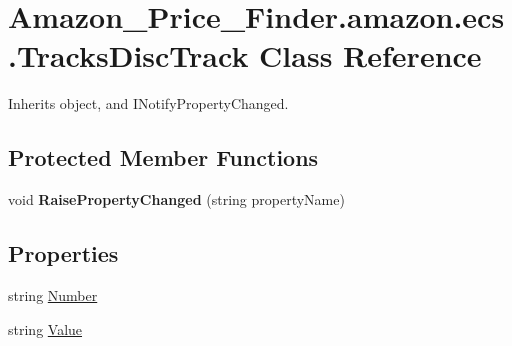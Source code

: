 \hypertarget{class_amazon___price___finder_1_1amazon_1_1ecs_1_1_tracks_disc_track}{\section{Amazon\-\_\-\-Price\-\_\-\-Finder.\-amazon.\-ecs.\-Tracks\-Disc\-Track Class Reference}
\label{class_amazon___price___finder_1_1amazon_1_1ecs_1_1_tracks_disc_track}
}


 




Inherits object, and I\-Notify\-Property\-Changed.

\subsection*{Protected Member Functions}
\begin{DoxyCompactItemize}
\item 
\hypertarget{class_amazon___price___finder_1_1amazon_1_1ecs_1_1_tracks_disc_track_a9b4ac21d74232a1eed1b5ffbf59f2ffa}{void {\bfseries Raise\-Property\-Changed} (string property\-Name)}\label{class_amazon___price___finder_1_1amazon_1_1ecs_1_1_tracks_disc_track_a9b4ac21d74232a1eed1b5ffbf59f2ffa}

\end{DoxyCompactItemize}
\subsection*{Properties}
\begin{DoxyCompactItemize}
\item 
\hypertarget{class_amazon___price___finder_1_1amazon_1_1ecs_1_1_tracks_disc_track_aa22ef29bf7fa529489b722a8ecc050ba}{string \hyperlink{class_amazon___price___finder_1_1amazon_1_1ecs_1_1_tracks_disc_track_aa22ef29bf7fa529489b722a8ecc050ba}{Number}}\label{class_amazon___price___finder_1_1amazon_1_1ecs_1_1_tracks_disc_track_aa22ef29bf7fa529489b722a8ecc050ba}

\begin{DoxyCompactList}\small\item\em \end{DoxyCompactList}\item 
\hypertarget{class_amazon___price___finder_1_1amazon_1_1ecs_1_1_tracks_disc_track_a61125cc1741957f2ceb994be94dfaa13}{string \hyperlink{class_amazon___price___finder_1_1amazon_1_1ecs_1_1_tracks_disc_track_a61125cc1741957f2ceb994be94dfaa13}{Value}}\label{class_amazon___price___finder_1_1amazon_1_1ecs_1_1_tracks_disc_track_a61125cc1741957f2ceb994be94dfaa13}

\begin{DoxyCompactList}\small\item\em \end{DoxyCompactList}\end{DoxyCompactItemize}
